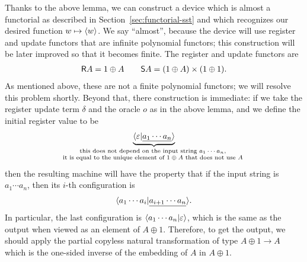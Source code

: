 Thanks to the above lemma, we can construct a device which is almost a functorial \sst as described in Section~\ref{sec:functorial-sst} and which recognizes our desired function $w \mapsto \langle w \rangle$. We say ``almost'', because the device will use register and update functors that are  infinite polynomial functors; this construction will be later improved so that it becomes finite.  The register and update functors are 
\begin{align*}
\mathsf R A  = 1 \oplus A \qquad \mathsf S A = (1 \oplus A) \times (1 \oplus 1).
\end{align*}
As mentioned above, these are  not a finite polynomial functors; we will resolve this problem shortly. Beyond that, there construction is immediate: if we take the register update term $\delta$ and the oracle $o$ as in the above lemma, and we define the initial register value to be 
\begin{align*}
\myunderbrace{\tuple{\varepsilon | \underline{a_1 \cdots a_n}}}{this does not depend on the input string $a_1 \cdots a_n$, \\ it is equal to the unique element of $1 \oplus A$ that does not use $A$}
\end{align*}
then the resulting machine will have the property that  if the input string is $a_1 \cdots a_n$, then its $i$-th configuration is 
\begin{align*}
\langle a_1 \cdots a_{i}| \underline{a_{i+1} \cdots a_n} \rangle.
\end{align*}
In particular, the last configuration is $\langle a_1 \cdots a_n | \varepsilon \rangle$, which is the same as the output when viewed as an element of $A \oplus 1$. Therefore, to get the output, we should apply the partial copyless natural transformation of type $A \oplus 1 \to A$ which is the one-sided inverse of the embedding of $A$ in $A \oplus 1$.  

